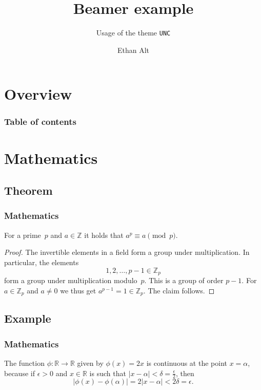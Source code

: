 \documentclass{beamer}
\author{Ethan Alt}
\title{Beamer example}
\subtitle{Usage of the theme \texttt{UNC}}
\begin{document}
\section{Overview}
%
%
\begin{frame}
    \frametitle{Table of contents}
    \tableofcontents[currentsection]
\end{frame}

\section{Mathematics}
\subsection{Theorem}

\begin{frame}
    \frametitle{Mathematics}

    \begin{theorem}
        For a prime~\(p\) and \(a \in \mathbb{Z}\) it holds that \(a^p \equiv a \pmod{p}\).
    \end{theorem}

    \begin{proof}
        The invertible elements in a field form a group under multiplication.
        In particular, the elements
        \begin{equation*}
            1, 2, \ldots, p - 1 \in \mathbb{Z}_p
        \end{equation*}
        form a group under multiplication modulo~\(p\).
        This is a group of order \(p - 1\).
        For \(a \in \mathbb{Z}_p\) and \(a \neq 0\) we thus get \(a^{p-1} = 1 \in \mathbb{Z}_p\).
        The claim follows.
    \end{proof}
\end{frame}

\subsection{Example}

\begin{frame}
    \frametitle{Mathematics}

    \begin{example}
        The function \(\phi \colon \mathbb{R} \to \mathbb{R}\) given by \(\phi(x) = 2x\) is continuous at the point \(x = \alpha\),
        because if \(\epsilon > 0\) and \(x \in \mathbb{R}\) is such that \(\lvert x - \alpha \rvert < \delta = \frac{\epsilon}{2}\),
        then
        \begin{equation*}
            \lvert \phi(x) - \phi(\alpha)\rvert = 2\lvert x - \alpha \rvert < 2\delta = \epsilon.
        \end{equation*}
    \end{example}
\end{frame}
\end{document}
